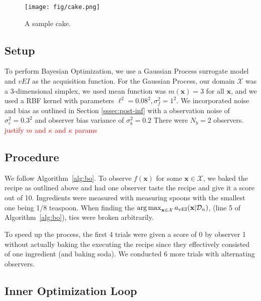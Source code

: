 \begin{figure}[h]
    \centering
    \texttt{[image: fig/cake.png]}
    \caption{A sample cake.}
    \label{fig:cake}
\end{figure}

\subsection{Setup}

To perform Bayesian Optimization, we use a Gaussian Process surrogate model and $vEI$ as the acquisition function.
For the Gaussian Process, our domain $\mathcal{X}$ was a 3-dimensional simplex, we used mean function was $m(\mathbf{x}) = 3$ for all $\mathbf{x}$, and we used a RBF kernel with parameters $\ell^2 = 0.08^2, \sigma^2_f = 1 ^ 2$.
We incorporated noise and bias as outlined in Section \ref{sssec:post-inf} with a observation noise of $\sigma^2_{\epsilon} = 0.3 ^ 2$ and observer bias variance of $\sigma_b^2 = 0.2$ There were $N_b = 2$ observers.
\textcolor{red}{justify $m$ and $\kappa$ and $\kappa$ params}
\subsection{Procedure}

We follow Algorithm~\ref{alg:bo}.
To observe $f(\mathbf{x})$ for some $\mathbf{x} \in \mathcal{X}$, we baked the recipe as outlined above and had one observer taste the recipe and give it a score out of 10.
Ingredients were measured with measuring spoons with the smallest one being 1/8 teaspoon.
When finding the $\operatorname*{arg\,max}_{\mathbf{x} \in \mathcal{X} } a_{\mathrm{vEI}}( \mathbf{x} | \mathcal{D}_n)$, (line 5 of Algorithm~\ref{alg:bo}), ties were broken arbitrarily.

To speed up the process, the first 4 trials were given a score of 0 by observer 1 without actually baking the executing the recipe since they effectively consisted of one ingredient (and baking soda).
We conducted 6 more trials with alternating observers.

\subsection{Inner Optimization Loop}

